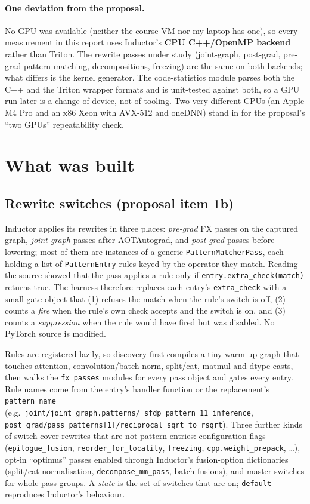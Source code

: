 \documentclass[11pt]{article}
\newcommand{\code}[1]{\texttt{#1}}
\begin{document}
\paragraph{One deviation from the proposal.} No GPU was available (neither the course VM nor my
laptop has one), so every measurement in this report uses Inductor's \textbf{CPU C++/OpenMP backend}
rather than Triton. The rewrite passes under study (joint-graph, post-grad, pre-grad pattern
matching, decompositions, freezing) are the same on both backends; what differs is the kernel
generator. The code-statistics module parses both the C++ and the Triton wrapper formats and is
unit-tested against both, so a GPU run later is a change of device, not of tooling. Two very
different CPUs (an Apple M4 Pro and an x86 Xeon with AVX-512 and oneDNN) stand in for the
proposal's ``two GPUs'' repeatability check.

\section{What was built}
\subsection{Rewrite switches (proposal item 1b)}
Inductor applies its rewrites in three places: \emph{pre-grad} FX passes on the captured graph,
\emph{joint-graph} passes after AOTAutograd, and \emph{post-grad} passes before lowering; most of
them are instances of a generic \code{PatternMatcherPass}, each holding a list of
\code{PatternEntry} rules keyed by the operator they match. Reading the source showed that the pass
applies a rule only if \code{entry.extra\_check(match)} returns true. The harness therefore
replaces each entry's \code{extra\_check} with a small gate object that (1) refuses the match when
the rule's switch is off, (2) counts a \emph{fire} when the rule's own check accepts and the switch
is on, and (3) counts a \emph{suppression} when the rule would have fired but was disabled. No
PyTorch source is modified.

Rules are registered lazily, so discovery first compiles a tiny warm-up graph that touches
attention, convolution/batch-norm, split/cat, matmul and dtype casts, then walks the
\code{fx\_passes} modules for every pass object and gates every entry. Rule names come from the
entry's handler function or the replacement's \code{pattern\_name}
(e.g.\ \code{joint/joint\_graph.patterns/\_sfdp\_pattern\_11\_inference},
\code{post\_grad/pass\_patterns[1]/reciprocal\_sqrt\_to\_rsqrt}). Three further kinds of switch cover
rewrites that are not pattern entries: configuration flags (\code{epilogue\_fusion},
\code{reorder\_for\_locality}, \code{freezing}, \code{cpp.weight\_prepack}, \ldots), opt-in
``optimus'' passes enabled through Inductor's fusion-option dictionaries (split/cat normalisation,
\code{decompose\_mm\_pass}, batch fusions), and master switches for whole pass groups. A
\emph{state} is the set of switches that are on; \code{default} reproduces Inductor's behaviour.
\end{document}
